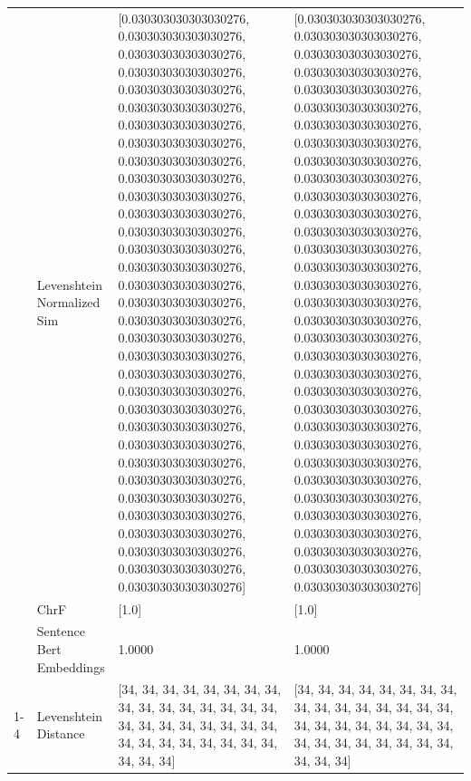 \begin{tabular}{llll}
 & Levenshtein Normalized Sim & [0.030303030303030276, 0.030303030303030276, 0.030303030303030276, 0.030303030303030276, 0.030303030303030276, 0.030303030303030276, 0.030303030303030276, 0.030303030303030276, 0.030303030303030276, 0.030303030303030276, 0.030303030303030276, 0.030303030303030276, 0.030303030303030276, 0.030303030303030276, 0.030303030303030276, 0.030303030303030276, 0.030303030303030276, 0.030303030303030276, 0.030303030303030276, 0.030303030303030276, 0.030303030303030276, 0.030303030303030276, 0.030303030303030276, 0.030303030303030276, 0.030303030303030276, 0.030303030303030276, 0.030303030303030276, 0.030303030303030276, 0.030303030303030276, 0.030303030303030276, 0.030303030303030276, 0.030303030303030276, 0.030303030303030276] & [0.030303030303030276, 0.030303030303030276, 0.030303030303030276, 0.030303030303030276, 0.030303030303030276, 0.030303030303030276, 0.030303030303030276, 0.030303030303030276, 0.030303030303030276, 0.030303030303030276, 0.030303030303030276, 0.030303030303030276, 0.030303030303030276, 0.030303030303030276, 0.030303030303030276, 0.030303030303030276, 0.030303030303030276, 0.030303030303030276, 0.030303030303030276, 0.030303030303030276, 0.030303030303030276, 0.030303030303030276, 0.030303030303030276, 0.030303030303030276, 0.030303030303030276, 0.030303030303030276, 0.030303030303030276, 0.030303030303030276, 0.030303030303030276, 0.030303030303030276, 0.030303030303030276, 0.030303030303030276, 0.030303030303030276] \\
 & ChrF & [1.0] & [1.0] \\
 & Sentence Bert Embeddings & 1.0000 & 1.0000 \\
\cline{1-4}
\multirow[t]{4}{*}{Obore nigo bore oboigoro k’ogose.} & Levenshtein Distance & [34, 34, 34, 34, 34, 34, 34, 34, 34, 34, 34, 34, 34, 34, 34, 34, 34, 34, 34, 34, 34, 34, 34, 34, 34, 34, 34, 34, 34, 34, 34, 34, 34, 34, 34] & [34, 34, 34, 34, 34, 34, 34, 34, 34, 34, 34, 34, 34, 34, 34, 34, 34, 34, 34, 34, 34, 34, 34, 34, 34, 34, 34, 34, 34, 34, 34, 34, 34, 34, 34] \\

\end{tabular}

